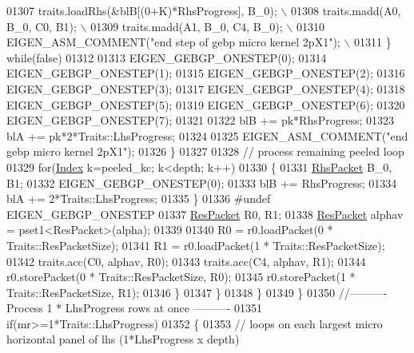 \begin{DoxyCode}
01307 \textcolor{preprocessor}{              traits.loadRhs(&blB[(0+K)*RhsProgress], B\_0);                       \(\backslash\)}
01308 \textcolor{preprocessor}{              traits.madd(A0, B\_0, C0, B1);                                       \(\backslash\)}
01309 \textcolor{preprocessor}{              traits.madd(A1, B\_0, C4, B\_0);                                      \(\backslash\)}
01310 \textcolor{preprocessor}{              EIGEN\_ASM\_COMMENT("end step of gebp micro kernel 2pX1");            \(\backslash\)}
01311 \textcolor{preprocessor}{            \} while(false)}
01312         
01313             EIGEN\_GEBGP\_ONESTEP(0);
01314             EIGEN\_GEBGP\_ONESTEP(1);
01315             EIGEN\_GEBGP\_ONESTEP(2);
01316             EIGEN\_GEBGP\_ONESTEP(3);
01317             EIGEN\_GEBGP\_ONESTEP(4);
01318             EIGEN\_GEBGP\_ONESTEP(5);
01319             EIGEN\_GEBGP\_ONESTEP(6);
01320             EIGEN\_GEBGP\_ONESTEP(7);
01321 
01322             blB += pk*RhsProgress;
01323             blA += pk*2*Traits::LhsProgress;
01324 
01325             EIGEN\_ASM\_COMMENT(\textcolor{stringliteral}{"end gebp micro kernel 2pX1"});
01326           \}
01327 
01328           \textcolor{comment}{// process remaining peeled loop}
01329           \textcolor{keywordflow}{for}(\hyperlink{namespace_eigen_a62e77e0933482dafde8fe197d9a2cfde}{Index} k=peeled\_kc; k<depth; k++)
01330           \{
01331             \hyperlink{class_eigen_1_1internal_1_1_tensor_lazy_evaluator_writable}{RhsPacket} B\_0, B1;
01332             EIGEN\_GEBGP\_ONESTEP(0);
01333             blB += RhsProgress;
01334             blA += 2*Traits::LhsProgress;
01335           \}
01336 \textcolor{preprocessor}{#undef EIGEN\_GEBGP\_ONESTEP}
01337           \hyperlink{class_eigen_1_1internal_1_1_tensor_lazy_evaluator_writable}{ResPacket} R0, R1;
01338           \hyperlink{class_eigen_1_1internal_1_1_tensor_lazy_evaluator_writable}{ResPacket} alphav = pset1<ResPacket>(alpha);
01339 
01340           R0 = r0.loadPacket(0 * Traits::ResPacketSize);
01341           R1 = r0.loadPacket(1 * Traits::ResPacketSize);
01342           traits.acc(C0, alphav, R0);
01343           traits.acc(C4, alphav, R1);
01344           r0.storePacket(0 * Traits::ResPacketSize, R0);
01345           r0.storePacket(1 * Traits::ResPacketSize, R1);
01346           \}
01347         \}
01348       \}
01349     \}
01350     \textcolor{comment}{//---------- Process 1 * LhsProgress rows at once ----------}
01351     \textcolor{keywordflow}{if}(mr>=1*Traits::LhsProgress)
01352     \{
01353       \textcolor{comment}{// loops on each largest micro horizontal panel of lhs (1*LhsProgress x depth)}

\end{DoxyCode}
